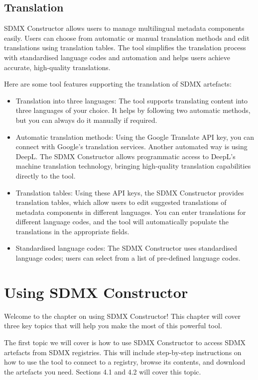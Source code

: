 \documentclass[
]{book}
\providecommand{\tightlist}{%
  \setlength{\itemsep}{0pt}\setlength{\parskip}{0pt}}
\begin{document}
\hypertarget{translation}{%
\section{Translation}\label{translation}}

SDMX Constructor allows users to manage multilingual metadata components easily. Users can choose from automatic or manual translation methods and edit translations using translation tables. The tool simplifies the translation process with standardised language codes and automation and helps users achieve accurate, high-quality translations.

Here are some tool features supporting the translation of SDMX artefacts:

\begin{itemize}
\tightlist
\item
  Translation into three languages: The tool supports translating content into three languages of your choice. It helps by following two automatic methods, but you can always do it manually if required.
\item
  Automatic translation methods: Using the Google Translate API key, you can connect with Google's translation services. Another automated way is using DeepL. The SDMX Constructor allows programmatic access to DeepL's machine translation technology, bringing high-quality translation capabilities directly to the tool.
\item
  Translation tables: Using these API keys, the SDMX Constructor provides translation tables, which allow users to edit suggested translations of metadata components in different languages. You can enter translations for different language codes, and the tool will automatically populate the translations in the appropriate fields.
\item
  Standardised language codes: The SDMX Constructor uses standardised language codes; users can select from a list of pre-defined language codes.
\end{itemize}

\hypertarget{using-sdmx}{%
\chapter{Using SDMX Constructor}\label{using-sdmx}}

Welcome to the chapter on using SDMX Constructor! This chapter will cover three key topics that will help you make the most of this powerful tool.

The first topic we will cover is how to use SDMX Constructor to access SDMX artefacts from SDMX registries. This will include step-by-step instructions on how to use the tool to connect to a registry, browse its contents, and download the artefacts you need. Sections 4.1 and 4.2 will cover this topic.
\end{document}
